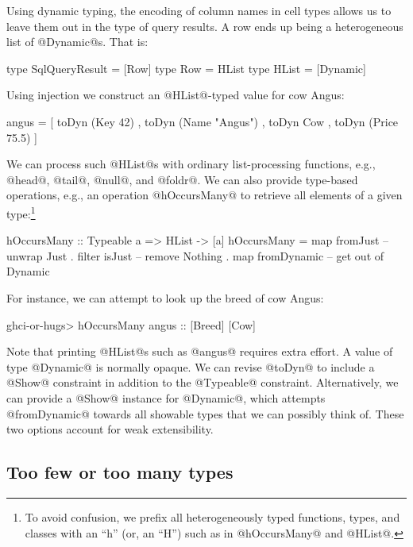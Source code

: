 \documentclass[nocopyrightspace,preprint]{sigplan-proc}
\begin{document}
Using dynamic typing, the encoding of column names in cell types
allows us to leave them out in the type of query results. A row ends
up being a heterogeneous list of @Dynamic@s. That is:

\begin{code}
 type SqlQueryResult = [Row]
 type Row            = HList
 type HList          = [Dynamic]
\end{code}

Using injection we construct an @HList@-typed value for cow Angus:

\begin{code}
 angus = [ toDyn (Key 42)
         , toDyn (Name "Angus")
         , toDyn Cow
         , toDyn (Price 75.5) ] 
\end{code}

We can process such @HList@s with ordinary list-processing functions,
e.g., @head@, @tail@, @null@, and @foldr@. We can also provide
type-based operations, e.g., an operation @hOccursMany@ to retrieve
all elements of a given type:\footnote{To avoid confusion, we prefix
all heterogeneously typed functions, types, and classes with an ``h''
(or, an ``H'') such as in @hOccursMany@ and @HList@.}

\begin{code}
 hOccursMany :: Typeable a => HList -> [a]
 hOccursMany = map fromJust    -- unwrap Just
             . filter isJust   -- remove Nothing
             . map fromDynamic -- get out of Dynamic
\end{code}

For instance, we can attempt to look up the breed of cow Angus:

\begin{code}
 ghci-or-hugs> hOccursMany angus :: [Breed]
 [Cow]
\end{code}

Note that printing @HList@s such as @angus@ requires extra effort. A
value of type @Dynamic@ is normally opaque. We can revise @toDyn@ to
include a @Show@ constraint in addition to the @Typeable@
constraint. Alternatively, we can provide a @Show@ instance for
@Dynamic@, which attempts @fromDynamic@ towards all showable types
that we can possibly think of. These two options account for weak
extensibility.

\medskip

\subsection*{Too few or too many types}
\end{document}
